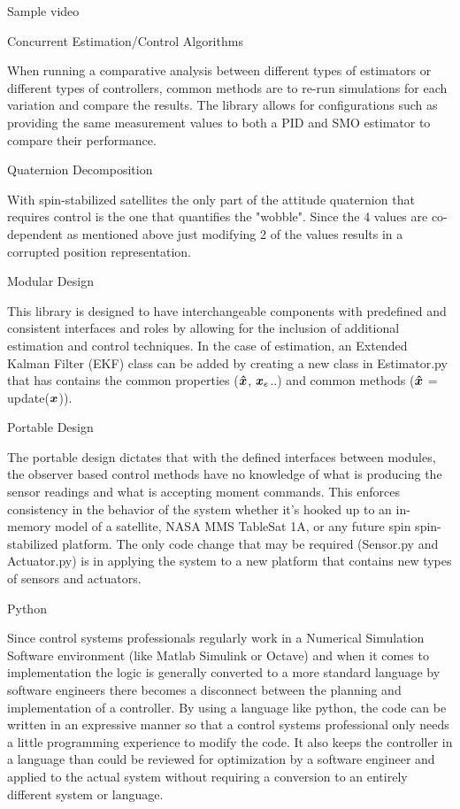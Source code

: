 Sample video

Concurrent Estimation/Control Algorithms

When running a comparative analysis between different types of estimators or different types of controllers, common methods are to re-run simulations for each variation and compare the results. The library allows for configurations such as providing the same measurement values to both a PID and SMO estimator to compare their performance.

Quaternion Decomposition

With spin-stabilized satellites the only part of the attitude quaternion that requires control is the one that quantifies the "wobble". Since the 4 values are co-dependent as mentioned above just modifying 2 of the values results in a corrupted position representation.

Modular Design

This library is designed to have interchangeable components with predefined and consistent interfaces and roles by allowing for the inclusion of additional estimation and control techniques. In the case of estimation, an Extended Kalman Filter (EKF) class can be added by creating a new class in Estimator.py that has contains the common properties ($\boldsymbol{\hat{x}}$, $\boldsymbol{x}_e$..) and common methods ($\boldsymbol{\hat{x}}$ = update($\boldsymbol{x}$)).

Portable Design

The portable design dictates that with the defined interfaces between modules, the observer based control methods have no knowledge of what is producing the sensor readings and what is accepting moment commands. This enforces consistency in the behavior of the system whether it's hooked up to an in-memory model of a satellite, NASA MMS TableSat 1A, or any future spin spin-stabilized platform. The only code change that may be required (Sensor.py and Actuator.py) is in applying the system to a new platform that contains new types of sensors and actuators.

Python

Since control systems professionals regularly work in a Numerical Simulation Software environment (like Matlab Simulink or Octave) and when it comes to implementation the logic is generally converted to a more standard language by software engineers there becomes a disconnect between the planning and implementation of a controller. By using a language like python, the code can be written in an expressive manner so that a control systems professional only needs a little programming experience to modify the code. It also keeps the controller in a language than could be reviewed for optimization by a software engineer and applied to the actual system without requiring a conversion to an entirely different system or language.
